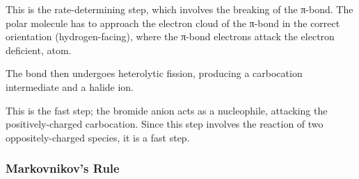 		This is the rate-determining step, which involves the breaking of the π-bond. The polar  molecule has to
		approach the electron cloud of the π-bond in the correct orientation (hydrogen-facing), where the π-bond electrons
		attack the electron deficient,  atom.

		The  bond then undergoes heterolytic fission, producing a carbocation intermediate and a halide ion.


		\pagebreak


		This is the fast step; the bromide anion acts as a nucleophile, attacking the positively-charged carbocation.
		Since this step involves the reaction of two oppositely-charged species, it is a fast step.


		\vspace{1.0em}











	\subsubsection{Markovnikov's Rule}

